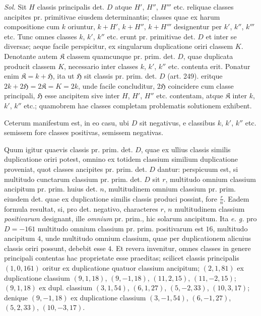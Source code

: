 \textit{Sol.} Sit $H$ classis principalis det. $D$ atque $H'$, $H''$, $H'''$ etc. reliquae
classes ancipites pr. primitivae eiusdem determinantis; classes quae ex harum
compositione cum $k$ oriuntur, $k+H'$, $k+H''$, $k+H'''$ designentur per $k'$, $k''$, $k'''$
etc. Tunc omnes classes $k$, $k'$, $k''$ etc. erunt pr. primitivae det. $D$ et inter se
diversae; aeque facile perspicitur, ex singularum duplicatione oriri classem $K$.
Denotante autem $\mathfrak{K}$ classem quamcunque pr. prim. det. $D$, quae duplicata producit
classem $K$, necessario inter classes $k$, $k'$, $k''$ etc. contenta erit. Ponatur
enim $\mathfrak{K}=k+\mathfrak{H}$, ita ut $\mathfrak{H}$ sit classis pr. prim. det. $D$ (art. 249). eritque
$2k+2\mathfrak{H}=2\mathfrak{K}=K=2k$, unde facile concluditur, $2\mathfrak{H}$ coincidere cum classe
principali, $\mathfrak{H}$ esse ancipitem sive inter $H$, $H'$, $H''$ etc. contentam, atque $\mathfrak{K}$ inter
$k$, $k'$, $k''$ etc.; quamobrem hae classes completam problematis solutionem exhibent.

Ceterum manifestum est, in eo casu, ubi $D$ sit negativus, e classibus
$k$, $k'$, $k''$ etc. semissem fore classes positivas, semissem negativas.

Quum igitur quaevis classis pr. prim. det. $D$, quae ex ullius classis similis
duplicatione oriri potest, omnino ex totidem classium similium duplicatione proveniat,
quot classes ancipites pr. prim. det. $D$ dantur: perspicuum est, si multitudo
cunctarum classium pr. prim. det. $D$ sit $r$, multitudo omnium classium
ancipitum pr. prim. huius det. $n$, multitudinem omnium classium pr. prim. eiusdem
det. quae ex duplicatione similis classis produci possint, fore $\frac{r}{n}$. Eadem
formula resultat, si, pro det. negativo, characteres $r$, $n$ multitudinem classium
\textit{positivarum} designant, ille \textit{omnium} pr. prim., hic solarum ancipitum. Ita \textit{e. g.} pro
$D=-161$ multitudo omnium classium pr. prim. positivarum est $16$, multitudo
ancipitum $4$, unde multitudo omnium classium, quae per duplicationem alicuius
classis oriri possunt, debebit esse $4$. Et revera invenitur, omnes classes in genere
principali contentas hac proprietate esse praeditas; scilicet classis principalis
$(1,0,161)$ oritur ex duplicatione quatuor classium ancipitum; $(2,1,81)$ ex duplicatione
classium $(9,1,18)$, $(9,-1,18)$, $(11,2,15)$, $(11,-2,15)$; $(9,1,18)$
ex dupl. classium $(3,1,54)$, $(6,1,27)$, $(5,-2,33)$, $(10,3,17)$; denique
$(9,-1,18)$ ex duplicatione classium $(3,-1,54)$, $(6,-1,27)$, $(5,2,33)$,
$(10,-3,17)$.

